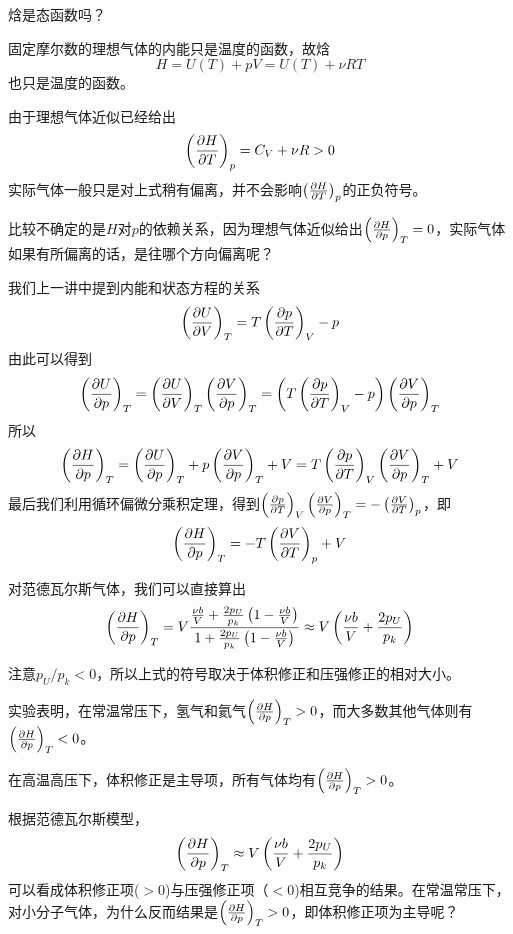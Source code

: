\documentclass[CJK]{beamer}
\begin{document}
\begin{frame}
\bch
{}
焓是态函数吗？
\ech
\end{frame}


\begin{frame}
\bch
固定摩尔数的理想气体的内能只是温度的函数，故焓
$$H = U(T) + pV = U(T) + \nu R T$$
也只是温度的函数。
\ech
\end{frame}

\begin{frame}
\bch
由于理想气体近似已经给出
$$\pfrac HTp =  C_V+ \nu R > 0$$
实际气体一般只是对上式稍有偏离，并不会影响$\pfrac HTp $的正负符号。

比较不确定的是$H$对$p$的依赖关系，因为理想气体近似给出$\pfrac HpT = 0$，实际气体如果有所偏离的话，是往哪个方向偏离呢？
\ech
\end{frame}

\begin{frame}
\bch
{\small
我们上一讲中提到内能和状态方程的关系{\blue
$$\pfrac UVT = T\pfrac pTV - p$$}
由此可以得到
$$\pfrac UpT = \pfrac UVT\pfrac VpT= \left(T\pfrac pTV - p\right) \pfrac VpT$$
所以
$$\pfrac HpT = \pfrac UpT  + p\pfrac VpT + V = T\pfrac pTV \pfrac VpT + V$$
最后我们利用循环偏微分乘积定理，得到$\pfrac pTV \pfrac VpT = - \pfrac VTp$，即
{\blue
$$\pfrac HpT = - T\pfrac VTp + V$$
}}
\ech
\end{frame}



\begin{frame}
\bch

对范德瓦尔斯气体，我们可以直接算出
$$\pfrac HpT = V\frac{\frac{\nu b}{V} + \frac{2p_U}{p_k}\left(1- \frac{\nu b}{V}\right)}{1 + \frac{2p_U}{p_k}\left(1-\frac{\nu b}{V}\right)}\approx V\left(\frac{\nu b}{V} +\frac{2p_U}{p_k}\right)$$

注意$p_U/p_k<0$，所以上式的符号取决于体积修正和压强修正的相对大小。

\emini
{}
{\small 
实验表明，在常温常压下，氢气和氦气$\pfrac HpT > 0$，而大多数其他气体则有$\pfrac HpT < 0$。

在高温高压下，体积修正是主导项，所有气体均有$\pfrac HpT > 0$。
}
\emini

\ech
\end{frame}

\begin{frame}
\bch
{}

根据范德瓦尔斯模型，$$\pfrac HpT\approx V\left(\frac{\nu b}{V} + \frac{2p_U}{p_k}\right)$$
可以看成体积修正项($>0$)与压强修正项（$<0$)相互竞争的结果。在常温常压下，对小分子气体，为什么反而结果是$\pfrac HpT > 0$，即体积修正项为主导呢？

\ech
\end{frame}
\end{document}
